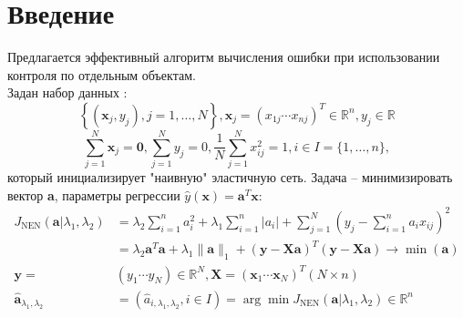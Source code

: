 \documentclass[12pt, twoside]{article}
\begin{document}
\section{Введение}
Предлагается эффективный алгоритм вычисления ошибки при использовании контроля по отдельным объектам.\\
Задан набор данных :
\begin{equation}\label{f1}
\left\{\left(\mathbf{x}_{j}, y_{j}\right), j=1, \ldots, N\right\}, \mathbf{x}_{j}=\left(x_{1 j} \cdots x_{n j}\right)^{T} \in \mathbb{R}^{n}, y_{j} \in \mathbb{R}
\end{equation}
\begin{equation}
\sum_{j=1}^{N} \mathbf{x}_{j}=\mathbf{0}, \sum_{j=1}^{N} y_{j}=0, \frac{1}{N} \sum_{j=1}^{N} x_{i j}^{2}=1, i \in I=\{1, \ldots, n\},
\end{equation}
который инициализирует "наивную" эластичную сеть. Задача -- минимизировать вектор \textbf{a}, параметры регрессии $\hat{y}(\mathbf{x})=\mathbf{a}^{T} \mathbf{x}$:
\begin{equation}
\begin{aligned} J_{\mathrm{NEN}}\left(\mathbf{a} | \lambda_{1}, \lambda_{2}\right) &=\lambda_{2} \sum_{i=1}^{n} a_{i}^{2}+\lambda_{1} \sum_{i=1}^{n}\left|a_{i}\right|+\sum_{j=1}^{N}\left(y_{j}-\sum_{i=1}^{n} a_{i} x_{i j}\right)^{2} \\ &=\lambda_{2} \mathbf{a}^{T} \mathbf{a}+\lambda_{1}\|\mathbf{a}\|_{1}+(\mathbf{y}-\mathbf{X} \mathbf{a})^{T}(\mathbf{y}-\mathbf{X} \mathbf{a}) \rightarrow \min (\mathbf{a}) \\ \mathbf{y}=&\left(y_{1} \cdots y_{N}\right) \in \mathbb{R}^{N}, \mathbf{X}=\left(\mathbf{x}_{1} \cdots \mathbf{x}_{N}\right)^{T}(N \times n) \\ \hat{\mathbf{a}}_{\lambda_{1}, \lambda_{2}} &=\left(\hat{a}_{i, \lambda_{1}, \lambda_{2}}, i \in I\right)=\arg \min J_{\mathrm{NEN}}\left(\mathbf{a} | \lambda_{1}, \lambda_{2}\right) \in \mathbb{R}^{n} \end{aligned}
\end{equation}
\end{document}
